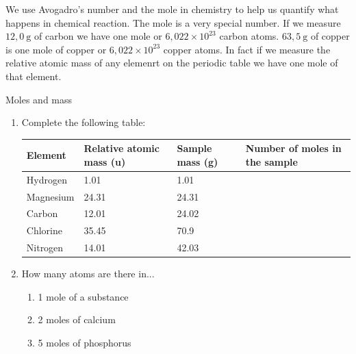 We use Avogadro's number and the mole in chemistry to help us quantify what happens in chemical reaction. The mole is a very special number. If we measure $12,0 ~\text{g}$ of carbon we have one mole or $6,022 \times 10^{23}$ carbon atoms. $63,5 ~\text{g}$ of copper is one mole of copper or $6,022 \times 10^{23}$ copper atoms. In fact if we measure the relative atomic mass of any elemenrt on the periodic table we have one mole of that element.
	\par
\label{m38717*secfhsst!!!underscore!!!id127}
            \begin{exercises}{Moles and mass
      }
            \nopagebreak
      \label{m38717*id276067}\begin{enumerate}[noitemsep, label=\textbf{\arabic*}. ] 
            \label{m38717*uid2}\item 
Complete the following table:
          \begin{table}[H]
        \begin{center}
      \label{m38717*id276082}
    \noindent
      \begin{tabular}{|l|l|l|l|}\hline
\textbf{Element} & \textbf{Relative atomic mass (u)} & \textbf{Sample mass (g)} & \textbf{Number of moles in the sample} \\ \hline
        Hydrogen & 1.01 & 1.01 & \\ \hline
        Magnesium & 24.31 & 24.31 & \\ \hline
        Carbon & 12.01 & 24.02 & \\ \hline
        Chlorine & 35.45 & 70.9 & \\ \hline
        Nitrogen & 14.01 & 42.03 & \\ \hline
    \end{tabular}
      \end{center}
\end{table}
    \par
          \label{m38717*uid3}\item 
How many atoms are there in...
\label{m38717*id276311}\begin{enumerate}[noitemsep, label=\textbf{\alph*}. ] 
            \label{m38717*uid4}\item 1 mole of a substance
\label{m38717*uid5}\item 2 moles of calcium
\label{m38717*uid6}\item 5 moles of phosphorus

\end{enumerate}
\end{enumerate}
\end{exercises}
